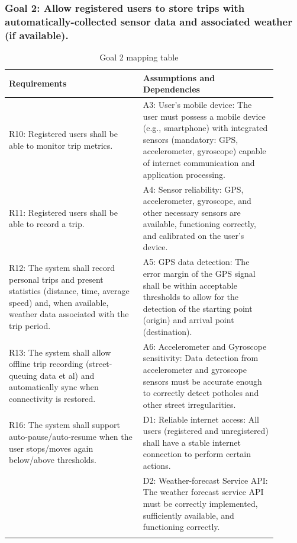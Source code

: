 \documentclass{Configuration_Files/PoliMi3i_thesis}
\begin{document}
    \subsubsection*{Goal 2: Allow registered users to store trips with automatically-collected sensor data and associated weather (if available).}
    \begin{longtable}{|p{0.45\linewidth}|p{0.45\linewidth}|}
    \hline
    \textbf{Requirements} & \textbf{Assumptions and Dependencies} \\ \hline
    R10: Registered users shall be able to monitor trip metrics.&A3: User’s mobile device: The user must possess a mobile device (e.g., smartphone) with integrated sensors (mandatory: GPS, accelerometer, gyroscope) capable of internet communication and application processing.\\
    R11: Registered users shall be able to record a trip.&A4: Sensor reliability: GPS, accelerometer, gyroscope, and other necessary sensors are available, functioning correctly, and calibrated on the user's device.\\
    R12: The system shall record personal trips and present statistics (distance, time, average speed) and, when available, weather data associated with the trip period.&A5: GPS data detection: The error margin of the GPS signal shall be within acceptable thresholds to allow for the detection of the starting point (origin) and arrival point (destination).\\
    R13: The system shall allow offline trip recording (street-queuing data et al) and automatically sync when connectivity is restored.&A6: Accelerometer and Gyroscope sensitivity: Data detection from accelerometer and gyroscope sensors must be accurate enough to correctly detect potholes and other street irregularities.\\
    R16: The system shall support auto-pause/auto-resume when the user stops/moves again below/above thresholds.&D1: Reliable internet access: All users (registered and unregistered) shall have a stable internet connection to perform certain actions.\\
    & D2: Weather-forecast Service API: The weather forecast service API must be correctly implemented, sufficiently available, and functioning correctly.\\
    \hline
    \caption{Goal 2 mapping table}
    \end{longtable}
    
\end{document}
